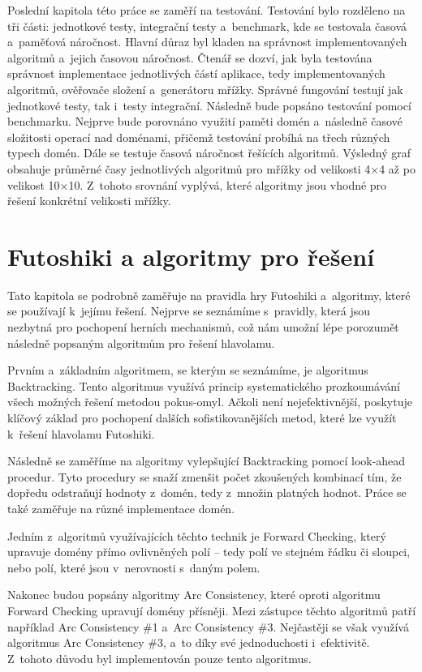 Poslední kapitola této práce se zaměří na testování. Testování bylo rozděleno
na tři části: jednotkové testy, integrační testy a~benchmark, kde se testovala
časová a~paměťová náročnost. Hlavní důraz byl kladen na správnost
implementovaných algoritmů a~jejich časovou náročnost. Čtenář se dozví, jak
byla testována správnost implementace jednotlivých částí aplikace, tedy
implementovaných algoritmů, ověřovače složení a~generátoru mřížky. Správné
fungování testují jak jednotkové testy, tak i~testy integrační. Následně bude
popsáno testování pomocí benchmarku. Nejprve bude porovnáno využití paměti
domén a~následně časové složitosti operací nad doménami, přičemž testování
probíhá na třech různých typech domén. Dále se testuje časová náročnost
řešících algoritmů. Výsledný graf obsahuje průměrné časy jednotlivých algoritmů
pro mřížky od velikosti 4×4 až po velikost 10×10. Z~tohoto srovnání vyplývá,
které algoritmy jsou vhodné pro řešení konkrétní velikosti mřížky.

\chapter{Futoshiki a algoritmy pro řešení}
\label{sec:futoshikiAlgs}

Tato kapitola se podrobně zaměřuje na pravidla hry Futoshiki a~algoritmy, které
se používají k~jejímu řešení. Nejprve se seznámíme s~pravidly, která jsou
nezbytná pro pochopení herních mechanismů, což nám umožní lépe porozumět
následně popsaným algoritmům pro řešení hlavolamu.

Prvním a~základním algoritmem, se kterým se seznámíme, je algoritmus
Backtracking. Tento algoritmus využívá princip systematického prozkoumávání
všech možných řešení metodou pokus-omyl. Ačkoli není nejefektivnější, poskytuje
klíčový základ pro pochopení dalších sofistikovanějších metod, které lze využít
k~řešení hlavolamu Futoshiki.

Následně se zaměříme na algoritmy vylepšující Backtracking pomocí look-ahead
procedur. Tyto procedury se snaží zmenšit počet zkoušených kombinací tím, že
dopředu odstraňují hodnoty z~domén, tedy z~množin platných hodnot. Práce se také
zaměřuje na různé implementace domén.

Jedním z~algoritmů využívajících těchto technik je Forward Checking, který
upravuje domény přímo ovlivněných polí – tedy polí ve stejném řádku či sloupci,
nebo polí, které jsou v~nerovnosti s~daným polem.

Nakonec budou popsány algoritmy Arc Consistency, které oproti algoritmu Forward
Checking upravují domény přísněji. Mezi zástupce těchto algoritmů patří
například Arc Consistency \#1 a~Arc Consistency \#3. Nejčastěji se však využívá
algoritmus Arc Consistency \#3, a~to díky své jednoduchosti i~efektivitě.
Z~tohoto důvodu byl implementován pouze tento algoritmus.

